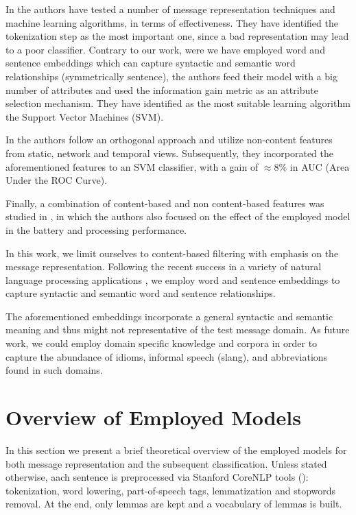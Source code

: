 \documentclass[letterpaper]{article}
\begin{document}
In \cite{gomez2006content} the authors have tested a number of message representation techniques and machine learning algorithms, in terms of effectiveness. They have identified the tokenization step as the most important one, since a bad representation may lead to a poor classifier. Contrary to our work, were we have employed word and sentence embeddings which can capture syntactic and semantic word relationships (symmetrically sentence), the authors feed their model with a big number of attributes and used the information gain metric \cite{yang1999evaluation} as an attribute selection mechanism. They have identified as the most suitable learning algorithm the Support Vector Machines (SVM).

In \cite{6133257} the authors follow an orthogonal approach and utilize non-content features from static, network and temporal views. Subsequently, they incorporated the aforementioned features to an SVM classifier, with a gain of $\approx 8\%$ in AUC (Area Under the ROC Curve).

Finally, a combination of content-based and non content-based features was studied in \cite{sulaiman2016new}, in which the authors also focused on the effect of the employed model in the battery and processing performance.

In this work, we limit ourselves to content-based filtering with emphasis on the message representation. Following the recent success in a variety of natural language processing applications \cite{mikolov2013distributed} \cite{bojanowski2016enriching} \cite{pagliardini2017unsupervised}, we employ word and sentence embeddings to capture syntactic and semantic word and sentence relationships.

The aforementioned embeddings incorporate a general syntactic and semantic meaning and thus might not representative of the test message domain. As future work, we could employ domain specific knowledge and corpora in order to capture the abundance of idioms, informal speech (slang), and abbreviations found in such domains.

\section{Overview of Employed Models} \label{Overview}

In this section we present a brief theoretical overview of the employed models for both message representation and the subsequent classification. Unless stated otherwise, aach sentence is preprocessed via Stanford CoreNLP tools (\cite{manning-EtAl2014}): tokenization, word lowering, part-of-speech tags, lemmatization and stopwords removal. At the end, only lemmas are kept and a vocabulary of lemmas is built.
\end{document}
